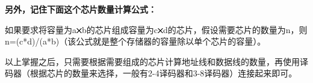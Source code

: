{ \textbf{} }

\textbf{{\textbf{另外，记住下面这个芯片数量计算公式：}}}

\textbf{}

{如果要求将容量为a}\includegraphics[width=0.09375in,height=0.08333in]{texmath/ff0c81times}{b的芯片组成容量为c}\includegraphics[width=0.09375in,height=0.08333in]{texmath/ff0c81times}{d的芯片，假设需要芯片的数量为n，则n=(c*d)/(a*b)（该公式就是整个存储器的容量除以单个芯片的容量）}。

以上掌握之后，只需要根据需要组成的芯片计算地址线和数据线的数量，再使用译码器（根据芯片的数量来选择，一般有2-4译码器和3-8译码器）连接起来即可。
